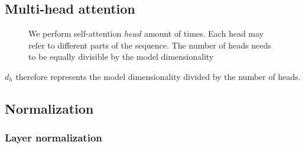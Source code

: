 \documentclass[11pt]{article}
\begin{document}
\subsection{Multi-head attention}

\begin{figure}[H]
    \centering
    \caption*{We perform self-attention $head$ amount of times. Each head may refer to different parts of the sequence. The number of heads needs to be equally divisible by the model dimensionality}
\end{figure}

$d_h$ therefore represents the model dimensionality divided by the number of heads.

\subsection{Normalization}

\subsubsection{Layer normalization}
\end{document}
